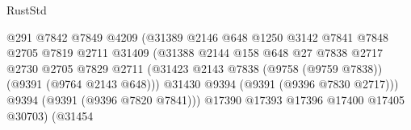 \begin{lexlean}{RustStd}
\begin{coremodule}
                                                  @291
                                                  @7842
                                                  @7849
                                                  @4209
                                                  (@31389
                                                    @2146
                                                    @648
                                                    @1250
                                                    @3142
                                                    @7841
                                                    @7848
                                                    @2705
                                                    @7819
                                                    @2711
                                                    @31409
                                                    (@31388
                                                      @2144
                                                      @158
                                                      @648
                                                      @27
                                                      @7838
                                                      @2717
                                                      @2730
                                                      @2705
                                                      @7829
                                                      @2711
                                                      (@31423
                                                        @2143
                                                        @7838
                                                        (@9758 (@9759 @7838))
                                                        (@9391 (@9764 @2143 @648)))
                                                      @31430
                                                      @9394
                                                      (@9391 (@9396 @7830 @2717)))
                                                    @9394
                                                    (@9391 (@9396 @7820 @7841)))
                                                  @17390
                                                  @17393
                                                  @17396
                                                  @17400
                                                  @17405
                                                  @30703)
                                                (@31454

\end{coremodule}
\end{lexlean}
